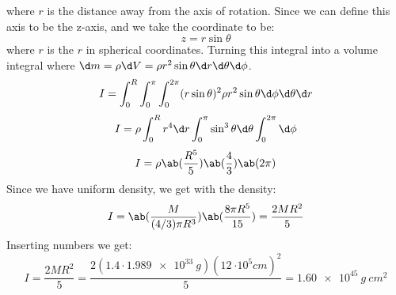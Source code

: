 where $r$ is the distance away from the axis of rotation. Since we can define this axis to be the z-axis, and we take the coordinate to be:
\begin{equation}
    z = r\sin\theta
\end{equation}
where $r$ is the $r$ in spherical coordinates. Turning this integral into a volume integral where $\d m = \rho \d V = \rho r^2\sin\theta \d r \d \theta \d \phi$.
\begin{equation}
    I = \int_{0}^{R}\int_{0}^{\pi}\int_{0}^{2\pi}(r\sin\theta)^2\rho r^2\sin\theta\d \phi \d \theta \d r
\end{equation}
\begin{equation}
    I = \rho\int_{0}^{R}r^4\d r\int_{0}^{\pi}\sin^3\theta\d \theta\int_{0}^{2\pi}\d \phi
\end{equation}
\begin{equation}
    I = \rho\ab(\frac{R^5}{5})\ab(\frac{4}{3})\ab(2\pi)
\end{equation}
Since we have uniform density, we get with the density:
\begin{equation}
    I = \ab(\frac{M}{(4/3)\pi R^3})\ab(\frac{8\pi R^5}{15}) =\frac{2MR^2}{5}
\end{equation}
Inserting numbers we get:
\begin{equation}
    I =\frac{2MR^2}{5} = \frac{2(1.4\cdot \qty{1.989e33}{g})(\qty{12}{\cdot10^5 cm})^2}{5} = \qty{1.60e45}{g\ cm^2}
\end{equation}
